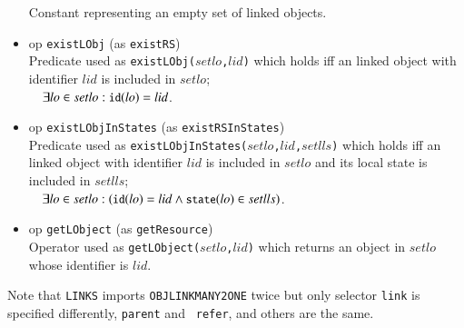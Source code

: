 \documentclass[12pt]{report}
\newcommand{\mbstt}[1]{\mbox{\small{\tt {#1}}}}
\newcommand{\stt}[1]{{\small{\tt {#1}}}}
\begin{document}
\begin{itemize}
  Constant representing an empty set of linked objects.
\item op \stt{existLObj} (as \stt{existRS})\\
  Predicate used as \stt{existLObj($setlo$,$lid$)} which holds iff an
  linked object with identifier $lid$ is included in
  $setlo$;\\$~~~~\exists lo\in setlo:\mbstt{id}(lo)=lid$.
\item op \stt{existLObjInStates} (as \stt{existRSInStates})\\
  Predicate used as \stt{existLObjInStates($setlo$,$lid$,$setlls$)}
  which holds iff an linked object with identifier $lid$ is included
  in $setlo$ and its local state is included in
  $setlls$;\\$~~~~\exists lo\in setlo:(\mbstt{id}(lo)=lid\land
  \mbstt{state}(lo)\in setlls)$.
\item op \stt{getLObject} (as \stt{getResource})\\
  Operator used as \stt{getLObject($setlo$,$lid$)} which returns an
  object in $setlo$ whose identifier is $lid$.
\end{itemize}
Note that {\tt LINKS} imports {\tt OBJLINKMANY2ONE} twice but only
selector {\tt link} is specified differently, {\tt parent} and {\tt
  refer}, and others are the same.
\end{document}
